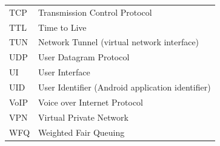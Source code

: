 \begin{longtable}{@{}p{3cm}p{10cm}@{}}
TCP     & Transmission Control Protocol \\
TTL     & Time to Live \\
TUN     & Network Tunnel (virtual network interface) \\
UDP     & User Datagram Protocol \\
UI      & User Interface \\
UID     & User Identifier (Android application identifier) \\
VoIP    & Voice over Internet Protocol \\
VPN     & Virtual Private Network \\
WFQ     & Weighted Fair Queuing \\

\bottomrule
\end{longtable}
